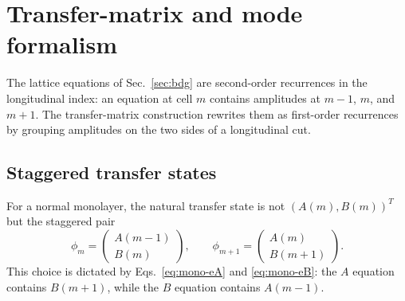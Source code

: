 \section{Transfer-matrix and mode formalism}
\label{sec:transfer}

The lattice equations of Sec.~\ref{sec:bdg} are second-order recurrences in the longitudinal index: an equation at cell $m$ contains amplitudes at $m-1$, $m$, and $m+1$.  The transfer-matrix construction rewrites them as first-order recurrences by grouping amplitudes on the two sides of a longitudinal cut.

\subsection{Staggered transfer states}
\label{subsec:staggered-states}

For a normal monolayer, the natural transfer state is not $(A(m),B(m))^T$ but the staggered pair
\begin{equation}
    \phi_m=
    \begin{pmatrix}
        A(m-1)\\ B(m)
    \end{pmatrix},
    \qquad
    \phi_{m+1}=
    \begin{pmatrix}
        A(m)\\ B(m+1)
    \end{pmatrix}.
    \label{eq:monolayer-state}
\end{equation}
This choice is dictated by Eqs.~\eqref{eq:mono-eA} and \eqref{eq:mono-eB}: the $A$ equation contains $B(m+1)$, while the $B$ equation contains $A(m-1)$.

